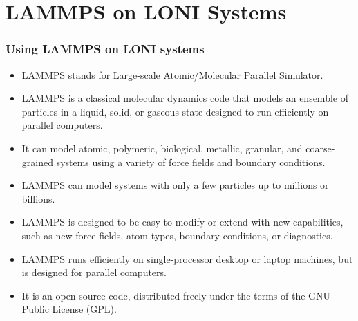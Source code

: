 \documentclass[slidestop,mathserif,compress,xcolor=svgnames]{beamer}
\begin{document}
\section{LAMMPS on LONI Systems}
\begin{frame}
\frametitle{\small Using LAMMPS on LONI systems}
\begin{itemize}
\item LAMMPS stands for Large-scale Atomic/Molecular Parallel Simulator.
\item LAMMPS is a classical molecular dynamics code that models an ensemble of particles in a liquid, solid, or gaseous state designed to run efficiently on parallel computers.
\item It can model atomic, polymeric, biological, metallic, granular, and coarse-grained systems using a variety of force fields and boundary conditions.
\item LAMMPS can model systems with only a few particles up to millions or billions.
\item LAMMPS is designed to be easy to modify or extend with new capabilities, such as new force fields, atom types, boundary conditions, or diagnostics.
\item LAMMPS runs efficiently on single-processor desktop or laptop machines, but is designed for parallel computers.
\item It is an open-source code, distributed freely under the terms of the GNU Public License (GPL).
\end{itemize}
\end{frame}
\end{document}

